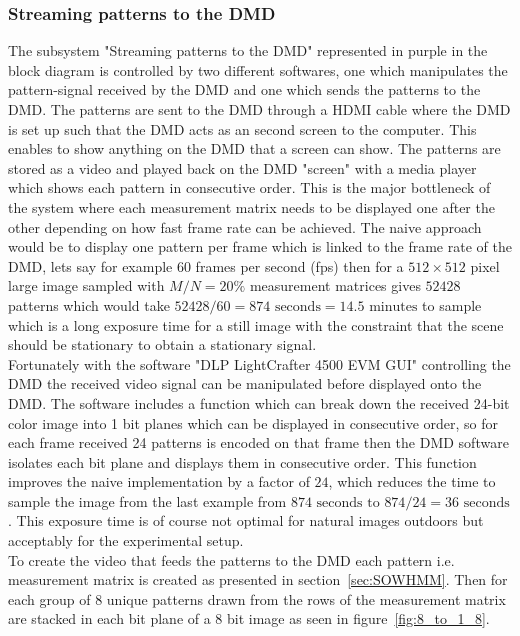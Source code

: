 \subsubsection{Streaming patterns to the DMD}
\label{sec:stream_dmd}
The subsystem "Streaming patterns to the DMD" represented in purple in the block diagram is controlled by two different softwares, one which manipulates the pattern-signal received by the DMD and one which sends the patterns to the DMD. The patterns are sent to the DMD through a HDMI cable where the DMD is set up such that the DMD acts as an second screen to the computer. This enables to show anything on the DMD that a screen can show. The patterns are stored as a video and played back on the DMD "screen" with a media player which shows each pattern in consecutive order. This is the major bottleneck of the system where each measurement matrix needs to be displayed one after the other depending on how fast frame rate can be achieved. The naive approach would be to display one pattern per frame which is linked to the frame rate of the DMD, lets say for example 60 frames per second (fps) then for a $512\times 512$ pixel large image sampled with $M/N = 20\%$ measurement matrices gives $52428$ patterns which would take $52428/60 = 874 \text{ seconds} = 14.5 \text{ minutes}$ to sample which is a long exposure time for a still image with the constraint that the scene should be stationary to obtain a stationary signal.\\[0.1in]

Fortunately with the software "DLP LightCrafter 4500 EVM GUI" controlling the DMD the received video signal can be manipulated before displayed onto the DMD. The software includes a function which can break down the received 24-bit color image into 1 bit planes which can be displayed in consecutive order, so for each frame received 24 patterns is encoded on that frame then the DMD software isolates each bit plane and displays them in consecutive order. This function improves the naive implementation by a factor of $24$, which reduces the time to sample the image from the last example from $874 \text{ seconds to } 874/24 = 36 \text{ seconds}$. This exposure time is of course not optimal for natural images outdoors but acceptably for the experimental setup.\\[0.1in]     


To create the video that feeds the patterns to the DMD each pattern  i.e. measurement matrix is created as presented in section~\ref{sec:SOWHMM}. Then for each group of 8 unique patterns drawn from the rows of the measurement matrix are stacked in each bit plane of a 8 bit image as seen in figure~\ref{fig:8_to_1_8}.

